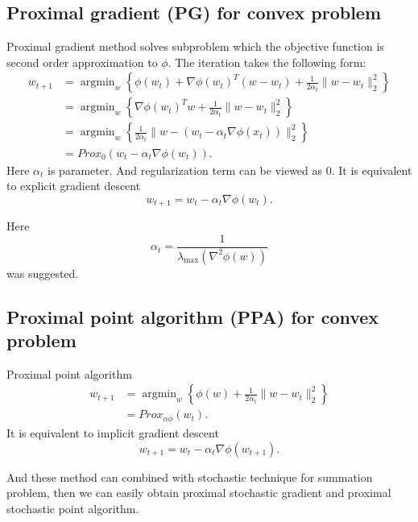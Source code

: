 \subsection{Proximal gradient  (PG) for convex problem}
Proximal gradient method solves subproblem which the objective function is second order approximation to $\phi$.
The iteration takes the following form:
\begin{equation}
	\begin{split}
		w_{t+1}&= \mathop{\arg \min}_w \left\lbrace \phi(w_t)+\nabla \phi(w_t)^T (w-w_t)+\frac{1}{2\alpha_t} \|w-w_t\|^2_2 \right \rbrace\\
		&=\mathop{\arg \min}_w \left\lbrace \nabla \phi(w_t)^T w+\frac{1}{2\alpha_t} \|w-w_t\|^2_2 \right \rbrace\\
		&=\mathop{\arg \min}_w \left\lbrace \frac{1}{2\alpha_t} \|w-(w_t-\alpha_t \nabla \phi(x_t))\|^2_2 \right \rbrace\\
		&=Prox_{0} (w_t-\alpha_t \nabla \phi(w_t)).
	\end{split}
\end{equation}
Here $\alpha_t$ is parameter.
And regularization term can be viewed as $0$.
It is equivalent to explicit gradient descent
\begin{equation}
	w_{t+1}=w_t -\alpha_t \nabla \phi(w_{t}).
\end{equation}

Here
$$\alpha_t=\frac{1}{\lambda_{\max} (\nabla^2 \phi(w))}$$
was suggested.

\subsection{Proximal point algorithm (PPA) for convex problem}
Proximal point algorithm
\begin{equation}
	\begin{split}
		w_{t+1}&= \mathop{\arg \min}_w \left\lbrace \phi(w)+\frac{1}{2\alpha_t} \|w-w_t\|^2_2 \right \rbrace\\
		&= Prox_{\alpha \phi} (w_t). 
	\end{split}
\end{equation}
It is equivalent to implicit gradient descent
\begin{equation}
	w_{t+1}=w_t -\alpha_t \nabla \phi(w_{t+1}).
\end{equation}

And these method can combined with stochastic technique for summation problem, then we can easily obtain proximal stochastic gradient and proximal stochastic point algorithm.

